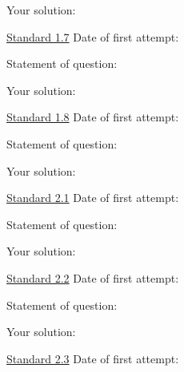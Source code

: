\documentclass[12pt]{article}
\begin{document}
\vspace{1in}

Your solution:

\newpage


\underline{Standard 1.7} \hspace{6cm} Date of first attempt:



\bigskip

Statement of question:

\vspace{1in}

Your solution:

\newpage


\underline{Standard 1.8} \hspace{6cm} Date of first attempt:



\bigskip

Statement of question:

\vspace{1in}

Your solution:

\newpage


\underline{Standard 2.1} \hspace{6cm} Date of first attempt:



\bigskip

Statement of question:

\vspace{1in}

Your solution:

\newpage


\underline{Standard 2.2} \hspace{6cm} Date of first attempt:



\bigskip

Statement of question:

\vspace{1in}

Your solution:

\newpage


\underline{Standard 2.3} \hspace{6cm} Date of first attempt:
\end{document}
